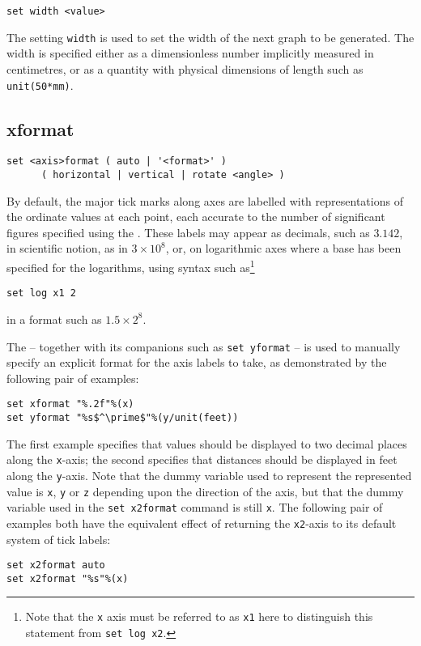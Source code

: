 \begin{verbatim}
set width <value>
\end{verbatim}

The setting {\tt width} is used to set the width of the next graph to be
generated. The width is specified either as a dimensionless number
implicitly measured in centimetres, or as a quantity with physical dimensions
of length such as {\tt unit(50*mm)}.


\subsection{xformat}

\begin{verbatim}
set <axis>format ( auto | '<format>' )
      ( horizontal | vertical | rotate <angle> )
\end{verbatim}

By default, the major tick marks along axes are labelled with representations
of the ordinate values at each point, each accurate to the number of
significant figures specified using the . These
labels may appear as decimals, such as $3.142$, in scientific notion, as in
$3\times10^8$, or, on logarithmic axes where a base has been specified for the
logarithms, using syntax such as\footnote{Note that the {\tt x} axis must be
referred to as {\tt x1} here to distinguish this statement from {\tt set log
x2}.}
\begin{verbatim}
set log x1 2
\end{verbatim}
in a format such as $1.5\times2^8$.

The  -- together with its companions such as {\tt set
yformat} -- is used to manually specify an explicit format for the axis labels
to take, as demonstrated by the following pair of examples:
\begin{verbatim}
set xformat "%.2f"%(x)
set yformat "%s$^\prime$"%(y/unit(feet))
\end{verbatim}
The first example specifies that values should be displayed to two
decimal places along the {\tt x}-axis; the second specifies that distances should
be displayed in feet along the {\tt y}-axis. Note that the dummy variable used to
represent the represented value is {\tt x}, {\tt y} or {\tt z} depending upon the
direction of the axis, but that the dummy variable used in the {\tt set
x2format} command is still {\tt x}. The following pair of examples both have
the equivalent effect of returning the {\tt x2}-axis to its default system of
tick labels:
\begin{verbatim}
set x2format auto
set x2format "%s"%(x)
\end{verbatim}

